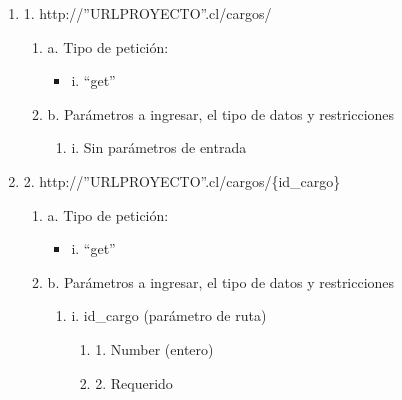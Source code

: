 \begin{enumerate}
    \item 1. http://”URLPROYECTO”.cl/cargos/
    \begin{enumerate}
        \item a. Tipo de petición:
            \begin{itemize}
               \item i. “get”
            \end{itemize}
        \item b. Parámetros a ingresar, el tipo de datos y restricciones
            \begin{enumerate}
                \item i. Sin parámetros de entrada
            \end{enumerate}
    \end{enumerate}

    \item 2. http://”URLPROYECTO”.cl/cargos/\{id\_cargo\}
    \begin{enumerate}
        \item a. Tipo de petición:
            \begin{itemize}
               \item i. “get”
            \end{itemize}
        \item b. Parámetros a ingresar, el tipo de datos y restricciones
            \begin{enumerate}
                \item i. id\_cargo (parámetro de ruta)
                    \begin{enumerate}
                        \item 1. Number (entero)
                        \item 2. Requerido
                    \end{enumerate}
            \end{enumerate}
    \end{enumerate}


\end{enumerate}
